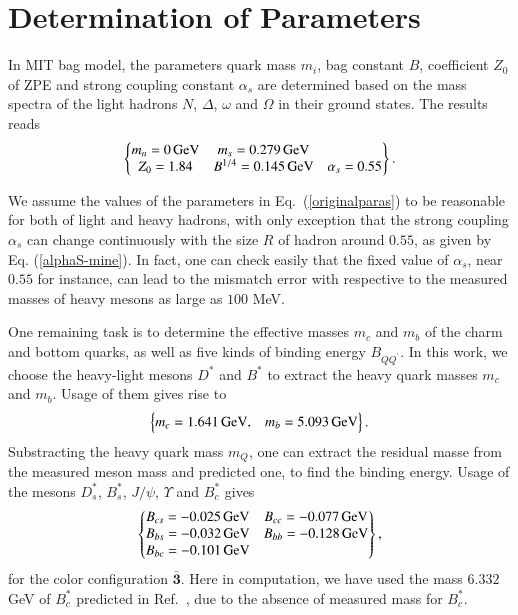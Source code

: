 \documentclass[prd,twocolumn,floatfix,nofootinbib]{revtex4}
\begin{document}
\section{Determination of Parameters}\label{Parameters}
In MIT bag model, the parameters quark mass $m_{i}$, bag constant $B$, coefficient $Z_{0}$ of ZPE and strong coupling constant $\alpha_{s}$ are determined based on the mass spectra of the light hadrons $N$, $\Delta$, $\omega$ and $\Omega$ in their ground states. 
The results reads \cite{DeGrand:1975cf}
\begin{equation}\label{originalparas}
    \begin{Bmatrix}
        m_{n}=0\,{\rm GeV} & m_{s}=0.279\,{\rm GeV} \\
        Z_{0}=1.84 & B^{1/4}=0.145\,{\rm GeV} & \alpha_{s}=0.55
    \end{Bmatrix}.
\end{equation}

We assume the values of the parameters in Eq.~(\ref{originalparas}) to be reasonable for both of light and heavy hadrons, 
with only exception that the strong coupling $\alpha_{s}$ can change continuously with the size $R$ of hadron around $0.55$, as given by Eq. (\ref{alphaS-mine}). 
In fact, one can check easily that the fixed value of $\alpha_{s}$, near $0.55$ for instance, can lead to the mismatch error with respective to the measured masses of heavy mesons as large as $100$ MeV.

One remaining task is to determine the effective masses $m_{c}$ and $m_{b}$ of the charm and bottom quarks, as well as five kinds of binding energy $B_{QQ^{\prime}}$. 
In this work, we choose the heavy-light mesons $D^{\ast}$ and $B^{\ast}$ to extract the heavy quark masses $m_{c}$ and $m_{b}$. 
Usage of them gives rise to
\begin{equation}\label{mcmb}
    \begin{Bmatrix}
        m_{c}=1.641\,{\rm GeV}, & m_{b}=5.093\,{\rm GeV}
    \end{Bmatrix}.
\end{equation}
Substracting the heavy quark mass $m_{Q}$, one can extract the residual masse from the measured meson mass and predicted one, to find the binding energy. 
Usage of the mesons $D_{s}^{\ast}$, $B_{s}^{\ast}$, $J/\psi$, $\Upsilon$ and $B_{c}^{\ast}$ gives 
\begin{equation}\label{bingdings}
    \begin{Bmatrix}
        B_{cs}=-0.025\,{\rm GeV} & B_{cc}=-0.077\,{\rm GeV} \\
        B_{bs}=-0.032\,{\rm GeV} & B_{bb}=-0.128\,{\rm GeV} \\
        B_{bc}=-0.101\,{\rm GeV}
    \end{Bmatrix},
\end{equation}
for the color configuration $\boldsymbol{\bar{3}}$. 
Here in computation, we have used the mass $6.332$ GeV of $B_{c}^{\ast}$ predicted in Ref.~\cite{Ebert:2002pp}, due to the absence of measured mass for $B_{c}^{\ast}$.
\end{document}
